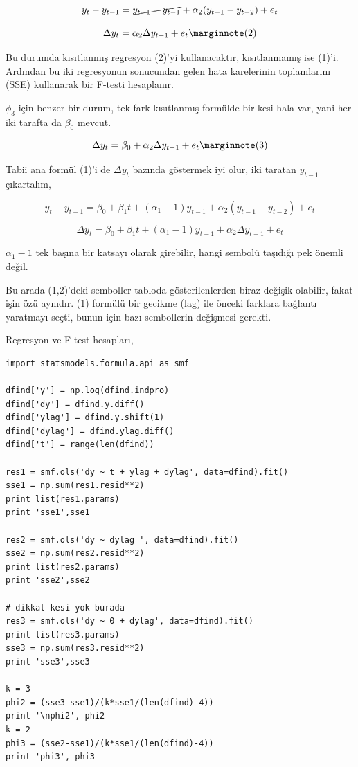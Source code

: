 \documentclass[12pt,fleqn]{article}\usepackage{../../common}
\begin{document}
$$ 
y_t - y_{t-1} =  \cancel{y_{t-1} - y_{t-1}} + \alpha_2 (y_{t-1} - y_{t-2}) + e_t 
$$

$$ 
\Delta y_t =  \alpha_2 \Delta y_{t-1}  + e_t  
\mlabel{2}
$$

Bu durumda kısıtlanmış regresyon (2)'yi kullanacaktır, kısıtlanmamış ise
(1)'i. Ardından bu iki regresyonun sonucundan gelen hata karelerinin
toplamlarını (SSE) kullanarak bir F-testi hesaplanır.

$\phi_3$ için benzer bir durum, tek fark kısıtlanmış formülde bir kesi hala
var, yani her iki tarafta da $\beta_0$ mevcut.

$$ 
\Delta y_t =  \beta_0 + \alpha_2 \Delta y_{t-1}  + e_t  
\mlabel{3}
$$

Tabii ana formül (1)'i de $\Delta y_t$ bazında göstermek iyi olur, iki
taratan $y_{t-1}$ çıkartalım,

$$ 
y_t-y_{t-1} = \beta_0 + \beta_1 t + (\alpha_1-1) y_{t-1} + \alpha_2 (y_{t-1} - y_{t-2}) + e_t 
$$

$$ 
\Delta y_t = \beta_0 + \beta_1 t + (\alpha_1-1) y_{t-1} + \alpha_2 \Delta y_{t-1} + e_t 
$$

$\alpha_1-1$ tek başına bir katsayı olarak girebilir, hangi sembolü
taşıdığı pek önemli değil.

Bu arada (1,2)'deki semboller tabloda gösterilenlerden biraz değişik
olabilir, fakat işin özü aynıdır. (1) formülü bir gecikme (lag) ile önceki
farklara bağlantı yaratmayı seçti, bunun için bazı sembollerin değişmesi
gerekti.

Regresyon ve F-test hesapları,

\begin{verbatim}
import statsmodels.formula.api as smf

dfind['y'] = np.log(dfind.indpro)
dfind['dy'] = dfind.y.diff()
dfind['ylag'] = dfind.y.shift(1)
dfind['dylag'] = dfind.ylag.diff()
dfind['t'] = range(len(dfind))

res1 = smf.ols('dy ~ t + ylag + dylag', data=dfind).fit()
sse1 = np.sum(res1.resid**2)
print list(res1.params)
print 'sse1',sse1

res2 = smf.ols('dy ~ dylag ', data=dfind).fit()
sse2 = np.sum(res2.resid**2)
print list(res2.params)
print 'sse2',sse2

# dikkat kesi yok burada
res3 = smf.ols('dy ~ 0 + dylag', data=dfind).fit()
print list(res3.params)
sse3 = np.sum(res3.resid**2)
print 'sse3',sse3

k = 3
phi2 = (sse3-sse1)/(k*sse1/(len(dfind)-4))
print '\nphi2', phi2
k = 2
phi3 = (sse2-sse1)/(k*sse1/(len(dfind)-4))
print 'phi3', phi3
\end{verbatim}
\end{document}
